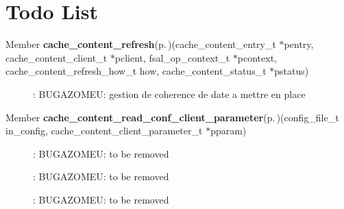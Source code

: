 \section{Todo List}\label{todo}
\label{todo__todo000001}
 \begin{description}
\item[Member {\bf cache\_\-content\_\-refresh}{\rm (p.\,\pageref{cache__content__flush_8c_a1})}(cache\_\-content\_\-entry\_\-t $\ast$pentry, cache\_\-content\_\-client\_\-t $\ast$pclient, fsal\_\-op\_\-context\_\-t $\ast$pcontext, cache\_\-content\_\-refresh\_\-how\_\-t how, cache\_\-content\_\-status\_\-t $\ast$pstatus) ]: BUGAZOMEU: gestion de coherence de date a mettre en place \end{description}


\label{todo__todo000002}
 \begin{description}
\item[Member {\bf cache\_\-content\_\-read\_\-conf\_\-client\_\-parameter}{\rm (p.\,\pageref{cache__content__read__conf_8c_a0})}(config\_\-file\_\-t in\_\-config, cache\_\-content\_\-client\_\-parameter\_\-t $\ast$pparam) ]: BUGAZOMEU: to be removed 

: BUGAZOMEU: to be removed 

: BUGAZOMEU: to be removed\end{description}

